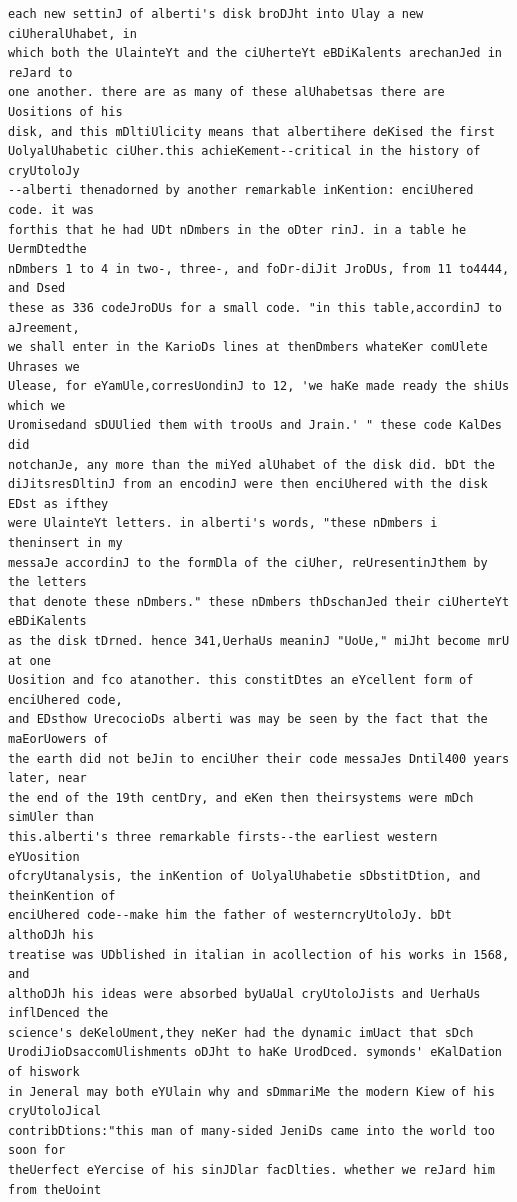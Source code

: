 \documentclass[12pt,a4paper]{article}
\begin{document}
\begin{lstlisting}[caption={Complete text after iteration 10}, label={lst:iter10}]
each new settinJ of alberti's disk broDJht into Ulay a new ciUheralUhabet, in
which both the UlainteYt and the ciUherteYt eBDiKalents arechanJed in reJard to
one another. there are as many of these alUhabetsas there are Uositions of his
disk, and this mDltiUlicity means that albertihere deKised the first
UolyalUhabetic ciUher.this achieKement--critical in the history of cryUtoloJy
--alberti thenadorned by another remarkable inKention: enciUhered code. it was
forthis that he had UDt nDmbers in the oDter rinJ. in a table he UermDtedthe
nDmbers 1 to 4 in two-, three-, and foDr-diJit JroDUs, from 11 to4444, and Dsed
these as 336 codeJroDUs for a small code. "in this table,accordinJ to aJreement,
we shall enter in the KarioDs lines at thenDmbers whateKer comUlete Uhrases we
Ulease, for eYamUle,corresUondinJ to 12, 'we haKe made ready the shiUs which we
Uromisedand sDUUlied them with trooUs and Jrain.' " these code KalDes did
notchanJe, any more than the miYed alUhabet of the disk did. bDt the
diJitsresDltinJ from an encodinJ were then enciUhered with the disk EDst as ifthey
were UlainteYt letters. in alberti's words, "these nDmbers i theninsert in my
messaJe accordinJ to the formDla of the ciUher, reUresentinJthem by the letters
that denote these nDmbers." these nDmbers thDschanJed their ciUherteYt eBDiKalents
as the disk tDrned. hence 341,UerhaUs meaninJ "UoUe," miJht become mrU at one
Uosition and fco atanother. this constitDtes an eYcellent form of enciUhered code,
and EDsthow UrecocioDs alberti was may be seen by the fact that the maEorUowers of
the earth did not beJin to enciUher their code messaJes Dntil400 years later, near
the end of the 19th centDry, and eKen then theirsystems were mDch simUler than
this.alberti's three remarkable firsts--the earliest western eYUosition
ofcryUtanalysis, the inKention of UolyalUhabetie sDbstitDtion, and theinKention of
enciUhered code--make him the father of westerncryUtoloJy. bDt althoDJh his
treatise was UDblished in italian in acollection of his works in 1568, and
althoDJh his ideas were absorbed byUaUal cryUtoloJists and UerhaUs inflDenced the
science's deKeloUment,they neKer had the dynamic imUact that sDch
UrodiJioDsaccomUlishments oDJht to haKe UrodDced. symonds' eKalDation of hiswork
in Jeneral may both eYUlain why and sDmmariMe the modern Kiew of his cryUtoloJical
contribDtions:"this man of many-sided JeniDs came into the world too soon for
theUerfect eYercise of his sinJDlar facDlties. whether we reJard him from theUoint

\end{lstlisting}
\end{document}
